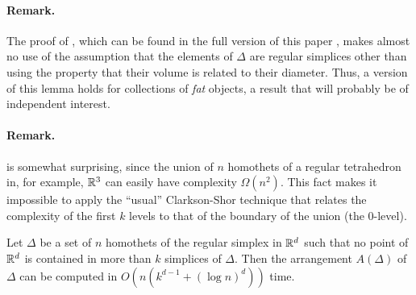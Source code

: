 \documentclass{llncs}
\begin{document}
\paragraph{Remark.} The proof of , which can be found
in the full version of this paper \cite{pricing_arxiv}, makes almost no use of
the assumption that the elements of $\Delta$ are regular simplices other
than using the property that their volume is related to their diameter.
Thus, a version of this lemma holds for collections of \emph{fat} objects,
a result that will probably be of independent interest.

\paragraph{Remark.}  is somewhat surprising, since the
union of $n$ homothets of a regular tetrahedron in, for example, $\mathbb{R}^3$ can
easily have complexity $\Omega(n^2)$.  This fact makes it impossible to
apply the ``usual'' Clarkson-Shor technique \cite{cs89} that relates the
complexity of the first $k$ levels to that of the boundary of the union
(the 0-level).

\begin{lem}
  Let $\Delta$ be a set of $n$ homothets of the regular simplex in
  $\mathbb{R}^d$ such that no point of $\mathbb{R}^d$ is contained in more than $k$
  simplices of $\Delta$.  Then the arrangement $A(\Delta)$ of $\Delta$
  can be computed in $O(n(k^{d-1}+(\log n)^{d}))$ time.
\end{lem}
\end{document}
